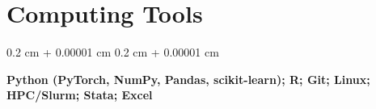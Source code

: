 \documentclass[10pt, letterpaper]{article}
\newenvironment{highlights}{
    \begin{itemize}[
        topsep=0.05 cm,
        parsep=0.05 cm,
        partopsep=0pt,
        itemsep=0pt,
        leftmargin=0.4 cm + 10pt
    ]
}{
    \end{itemize}
} %
\newenvironment{highlightsforbulletentries}{
    \begin{itemize}[
        topsep=0.10 cm,
        parsep=0.10 cm,
        partopsep=0pt,
        itemsep=0pt,
        leftmargin=10pt
    ]
}{
    \end{itemize}
} %
\newenvironment{onecolentry}{
    \begin{adjustwidth}{
        0.2 cm + 0.00001 cm
    }{
        0.2 cm + 0.00001 cm
    }
}{
    \end{adjustwidth}
} %
\newenvironment{twocolentry}[2][]{
    \onecolentry
    \def\secondColumn{#2}
    \setcolumnwidth{\fill, 4.5 cm}
    \begin{paracol}{2}
}{
    \switchcolumn \raggedleft \secondColumn
    \end{paracol}
    \endonecolentry
} %
\begin{document}
        

        
        

\vspace{-0.0cm}

\section{Computing Tools}
    \begin{onecolentry}
        \textbf{Python (PyTorch, NumPy, Pandas, scikit-learn); R; Git; Linux; HPC/Slurm; Stata; Excel}
    \end{onecolentry}
\end{document}
